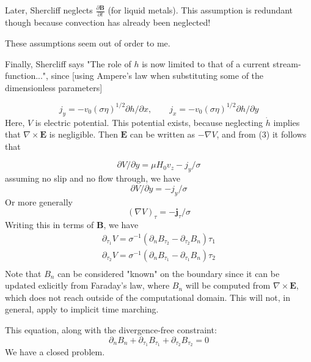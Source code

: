 \documentclass[11pt]{article}
\newcommand{\B}{\mathbf{B}}
\newcommand{\curl}{\nabla \times}
\newcommand{\PD}{\partial}
\newcommand{\J}{\mathbf{j}}
\newcommand{\E}{\mathbf{E}}
\begin{document}
Later, Shercliff neglects $\frac{\PD \B}{\PD t}$ (for liquid  metals). This assumption is redundant though because convection has already been neglected!

These assumptions seem out of  order to me.


Finally, Shercliff says "The role of $h$ is now limited to that of a current stream-function...", since [using Ampere's law when substituting some of the dimensionless parameters]

\begin{equation}
  j_y = -v_0 (\sigma \eta)^{1/2} \PD h/\PD x
  , \qquad
  j_x = -v_0 (\sigma \eta)^{1/2} \PD h/\PD y
\end{equation}
Here, $V$ is electric potential. This potential exists, because neglecting $\dot{h}$ implies that $\curl \E$ is negligible. Then $\E $ can be written as $ -\nabla V$, and from (3) it follows that

\begin{equation}
  \PD V / \PD y = \mu H_0 v_z - j_y/\sigma
\end{equation}
assuming no slip and no flow through, we have
\begin{equation}
  \PD V / \PD y = - j_y/\sigma
\end{equation}
Or more generally
\begin{equation}
  (\nabla V)_{\tau} = - \J_{\tau}/\sigma
\end{equation}
Writing this in terms of $\B$, we have
\begin{equation}
\begin{aligned}
  \PD_{\tau_1} V = \sigma^{-1}(\PD_n B_{\tau_2} - \PD_{\tau_2} B_n) \hat{\tau_1} \\
  \PD_{\tau_2} V = \sigma^{-1} (\PD_n B_{\tau_1} - \PD_{\tau_1} B_n) \hat{\tau_2} \\
\end{aligned}
\end{equation}
Note that $B_n$ can be considered "known" on the boundary since it can be updated exlicitly from Faraday's law, where $B_n$ will be computed from $\curl \E$, which does not reach outside of the computational domain. This will not, in general, apply to implicit time marching.

This equation, along with the divergence-free constraint:
\begin{equation}
  \PD_n B_n + \PD_{\tau_1} B_{\tau_1} + \PD_{\tau_2} B_{\tau_2} = 0
\end{equation}
We have a closed problem.
\end{document}
